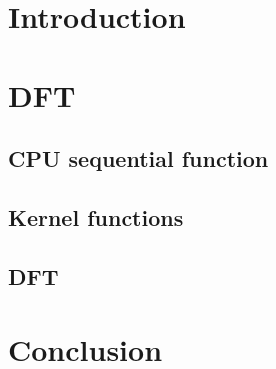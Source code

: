 
\section{Introduction}
\label{sec:introduction}

\section{DFT}
\label{sec:dft}

\subsection{CPU sequential function}
\label{subsec:cpu_function}

\subsection{Kernel functions}
\label{subsec:kernel_functions}

\subsection{DFT}
\label{subsec:timing}

\section{Conclusion}
\label{sec:conclusion}

